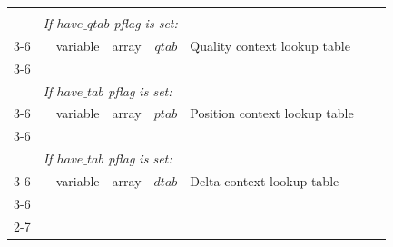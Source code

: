 \documentclass[a4paper]{article}
\begin{document}
\begin{table}
\begin{tabular}{|r|r|r|r|r|p{8cm}|l|l|}
& \multicolumn{6}{l|}{} & \\[-0.5em]
\multicolumn{1}{|l|}{} & \multicolumn{6}{l|}{ \textit{If $have\_qtab$ pflag is set:} } & \\
\cline{3-6}
                       &  & variable                   & array          & $qtab$                         & Quality context lookup table & & \\
\cline{3-6}

& \multicolumn{6}{l|}{} & \\[-0.5em]
\multicolumn{1}{|l|}{} & \multicolumn{6}{l|}{ \textit{If $have\_tab$ pflag is set:} } & \\
\cline{3-6}
                       &  & variable                   & array          & $ptab$                         & Position context lookup table & & \\
\cline{3-6}

& \multicolumn{6}{l|}{} & \\[-0.5em]
\multicolumn{1}{|l|}{} & \multicolumn{6}{l|}{ \textit{If $have\_tab$ pflag is set:} } & \\
\cline{3-6}
                       &  & variable                   & array          & $dtab$                         & Delta context lookup table & & \\
\cline{3-6}
& \multicolumn{6}{l|}{} & \\
\cline{2-7}
\multicolumn{8}{|l|}{}\\
\hline
\end{tabular}
\end{table}

%
%
%
%
\end{document}
